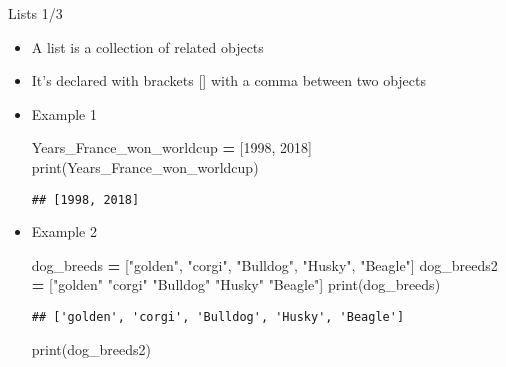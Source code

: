 \documentclass[
  8pt,
  ignorenonframetext,
]{beamer}
\newenvironment{Shaded}{\begin{snugshade}}{\end{snugshade}}
\newcommand{\BuiltInTok}[1]{#1}
\newcommand{\DecValTok}[1]{\textcolor[rgb]{0.00,0.00,0.81}{#1}}
\newcommand{\NormalTok}[1]{#1}
\newcommand{\OperatorTok}[1]{\textcolor[rgb]{0.81,0.36,0.00}{\textbf{#1}}}
\newcommand{\StringTok}[1]{\textcolor[rgb]{0.31,0.60,0.02}{#1}}
\providecommand{\tightlist}{%
  \setlength{\itemsep}{0pt}\setlength{\parskip}{0pt}}
\begin{document}
\begin{frame}[fragile]{Lists 1/3}
\protect\hypertarget{lists-13}{}
\begin{itemize}[<+->]
\tightlist
\item
  A list is a collection of related objects
\end{itemize}

\begin{itemize}[<+->]
\tightlist
\item
  It's declared with brackets {[}{]} with a comma between two objects
\end{itemize}

\begin{itemize}[<+->]
\item
  Example 1

\begin{Shaded}
\begin{Highlighting}[]
\NormalTok{Years\_France\_won\_worldcup }\OperatorTok{=}\NormalTok{ [}\DecValTok{1998}\NormalTok{, }\DecValTok{2018}\NormalTok{]}
\BuiltInTok{print}\NormalTok{(Years\_France\_won\_worldcup)}
\end{Highlighting}
\end{Shaded}

\begin{verbatim}
## [1998, 2018]
\end{verbatim}
\end{itemize}

\begin{itemize}[<+->]
\item
  Example 2

\begin{Shaded}
\begin{Highlighting}[]
\NormalTok{dog\_breeds }\OperatorTok{=}\NormalTok{ [}\StringTok{"golden"}\NormalTok{, }\StringTok{"corgi"}\NormalTok{, }\StringTok{"Bulldog"}\NormalTok{, }\StringTok{"Husky"}\NormalTok{, }\StringTok{"Beagle"}\NormalTok{]}
\NormalTok{dog\_breeds2 }\OperatorTok{=}\NormalTok{ [}\StringTok{"golden"} \StringTok{"corgi"} \StringTok{"Bulldog"} \StringTok{"Husky"} \StringTok{"Beagle"}\NormalTok{]}
\BuiltInTok{print}\NormalTok{(dog\_breeds)}
\end{Highlighting}
\end{Shaded}

\begin{verbatim}
## ['golden', 'corgi', 'Bulldog', 'Husky', 'Beagle']
\end{verbatim}

\begin{Shaded}
\begin{Highlighting}[]
\BuiltInTok{print}\NormalTok{(dog\_breeds2)}
\end{Highlighting}
\end{Shaded}


\end{itemize}
\end{frame}
\end{document}

